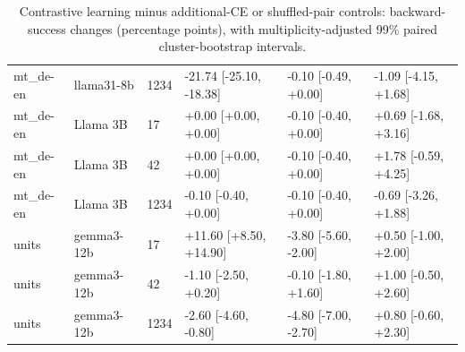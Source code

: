 \begin{table}[t]
\begin{tabular}{llllll}
mt\_de-en & llama31-8b & 1234 & -21.74 [-25.10, -18.38] & -0.10 [-0.49, +0.00] & -1.09 [-4.15, +1.68] \\
mt\_de-en & Llama 3B & 17 & +0.00 [+0.00, +0.00] & -0.10 [-0.40, +0.00] & +0.69 [-1.68, +3.16] \\
mt\_de-en & Llama 3B & 42 & +0.00 [+0.00, +0.00] & -0.10 [-0.40, +0.00] & +1.78 [-0.59, +4.25] \\
mt\_de-en & Llama 3B & 1234 & -0.10 [-0.40, +0.00] & -0.10 [-0.40, +0.00] & -0.69 [-3.26, +1.88] \\
units & gemma3-12b & 17 & +11.60 [+8.50, +14.90] & -3.80 [-5.60, -2.00] & +0.50 [-1.00, +2.00] \\
units & gemma3-12b & 42 & -1.10 [-2.50, +0.20] & -0.10 [-1.80, +1.60] & +1.00 [-0.50, +2.60] \\
units & gemma3-12b & 1234 & -2.60 [-4.60, -0.80] & -4.80 [-7.00, -2.70] & +0.80 [-0.60, +2.30] \\
\bottomrule
\end{tabular}
\caption{Contrastive learning minus additional-CE or shuffled-pair controls: backward-success changes (percentage points), with multiplicity-adjusted 99\% paired cluster-bootstrap intervals.}
\label{tab:contrastive-controls}
\end{table}
